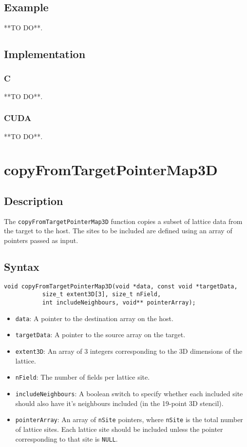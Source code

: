 \subsection{Example}
**TO DO**.
\subsection{Implementation}
\subsubsection{C}
**TO DO**.
\subsubsection{CUDA}
**TO DO**.

\newpage
\section{copyFromTargetPointerMap3D}

\subsection{Description}

The \verb+copyFromTargetPointerMap3D+ function copies a subset of lattice data from the target to the host. The sites to be included are defined using an array of pointers passed as input.

\subsection{Syntax}
\begin{verbatim}
void copyFromTargetPointerMap3D(void *data, const void *targetData, 
           size_t extent3D[3], size_t nField, 
           int includeNeighbours, void** pointerArray);
\end{verbatim}

\begin{itemize}
\item \verb+data+: A pointer to the destination array on the host.
\item \verb+targetData+: A pointer to the source array on the target.
\item \verb+extent3D+: An array of 3 integers corresponding to the 3D dimensions of the lattice.
\item \verb+nField+: The number of fields per lattice site.
\item \verb+includeNeighbours+: A boolean switch to specify whether each included site should also have it's neighbours included (in the 19-point 3D stencil).
\item \verb+pointerArray+: An array of \verb+nSite+ pointers, where \verb+nSite+ is the total number of lattice sites. Each lattice site should be included unless the pointer corresponding to that site is \verb+NULL+.  
\end{itemize}


